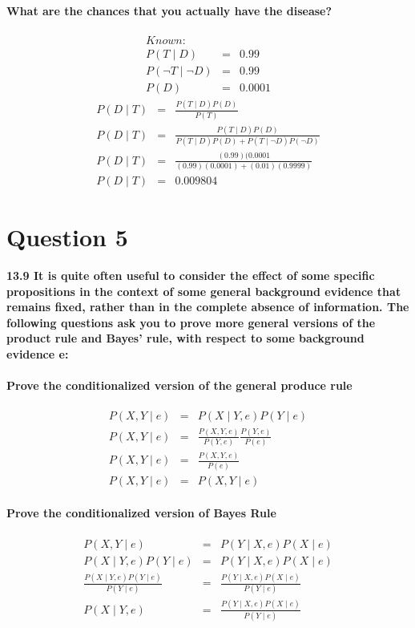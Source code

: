 \documentclass[a4paper, 12 pt, conference, onecolumn]{IEEEconf}
\begin{document}
\paragraph{What are the chances that you actually have the disease?}
\begin{eqnarray}
Known:\\
P(T \mid D ) &=& 0.99 \\
P(\neg T \mid \neg D) &=& 0.99 \\
P(D) &=& 0.0001
\end{eqnarray}
\begin{eqnarray}
P(D \mid T ) &=& \frac{P(T \mid D ) P(D)}{P(T)} \\
P(D \mid T ) &=& \frac{P(T \mid D ) P(D)}{P(T \mid D ) P(D)+ P(T \mid \neg D) P(\neg D)} \\
P(D \mid T ) &=&  \frac{(0.99)(0.0001}{(0.99)(0.0001)+(0.01)(0.9999)} \\
P(D \mid T ) &=& 0.009804
\end{eqnarray}

\section{Question 5}
\setcounter{paragraph}{0}
\textbf{13.9 It is quite often useful to consider the effect of some specific propositions in the context of some general background evidence that remains fixed, rather than in the complete absence of information. The following questions ask you to prove more general versions of the product rule and Bayes' rule, with respect to some background evidence e:}
\paragraph{Prove the conditionalized version of the general produce rule}

\begin{eqnarray}
P(X, Y \mid e) &=& P(X \mid Y, e) P( Y \mid e) \\
P(X, Y \mid e) &=& \frac{P(X, Y, e)}{P(Y, e)} \frac{P(Y, e)}{P(e)} \\
P(X, Y \mid e) &=& \frac{P(X, Y, e)}{P(e)} \\
P(X, Y \mid e) &=& P(X, Y \mid e)
\end{eqnarray}

\paragraph{Prove the conditionalized version of Bayes Rule}
\begin{eqnarray}
P(X, Y \mid e) &=& P(Y \mid X, e)P( X \mid e) \\
P(X \mid Y, e) P( Y \mid e) &=& P(Y \mid X, e)P( X \mid e) \\
\frac{P(X \mid Y, e) P( Y \mid e)}{P(Y \mid e)} &=& \frac{P(Y \mid X, e)P( X \mid e)}{P(Y \mid e)} \\
P(X \mid Y, e) &=& \frac{P( Y \mid X, e)P( X \mid e)}{P(Y \mid e)}
\end{eqnarray}

% 

% 
% 
%

\end{document}
